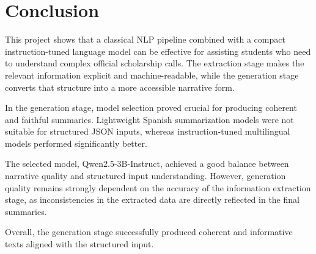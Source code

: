 \documentclass{article}
\begin{document}
\section{Conclusion}

This project shows that a classical NLP pipeline combined with a compact instruction-tuned language model can be effective for assisting students who need to understand complex official scholarship calls. The extraction stage makes the relevant information explicit and machine-readable, while the generation stage converts that structure into a more accessible narrative form.

In the generation stage, model selection proved crucial for producing coherent and faithful summaries. Lightweight Spanish summarization models were not suitable for structured JSON inputs, whereas instruction-tuned multilingual models performed significantly better.

The selected model, Qwen2.5-3B-Instruct, achieved a good balance between narrative quality and structured input understanding. However, generation quality remains strongly dependent on the accuracy of the information extraction stage, as inconsistencies in the extracted data are directly reflected in the final summaries.

Overall, the generation stage successfully produced coherent and informative texts aligned with the structured input.
\end{document}
